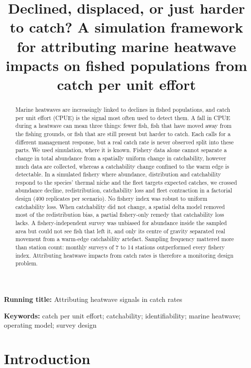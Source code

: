 \documentclass[11pt,a4paper]{article}
\title{Declined, displaced, or just harder to catch? A simulation framework for attributing marine heatwave impacts on fished populations from catch per unit effort}
\author{}
\date{}
\begin{document}
\maketitle
\linenumbers

\noindent\textbf{Running title:} Attributing heatwave signals in catch rates

\begin{abstract}
\noindent Marine heatwaves are increasingly linked to declines in fished populations, and catch per unit effort (CPUE) is the signal most often used to detect them. A fall in CPUE during a heatwave can mean three things: fewer fish, fish that have moved away from the fishing grounds, or fish that are still present but harder to catch. Each calls for a different management response, but a real catch rate is never observed split into these parts. We used simulation, where it is known. Fishery data alone cannot separate a change in total abundance from a spatially uniform change in catchability, however much data are collected, whereas a catchability change confined to the warm edge is detectable. In a simulated fishery where abundance, distribution and catchability respond to the species' thermal niche and the fleet targets expected catches, we crossed abundance decline, redistribution, catchability loss and fleet contraction in a factorial design (400 replicates per scenario). No fishery index was robust to uniform catchability loss. When catchability did not change, a spatial delta model removed most of the redistribution bias, a partial fishery-only remedy that catchability loss lacks. A fishery-independent survey was unbiased for abundance inside the sampled area but could not see fish that left it, and only its centre of gravity separated real movement from a warm-edge catchability artefact. Sampling frequency mattered more than station count: monthly surveys of 7 to 14 stations outperformed every fishery index. Attributing heatwave impacts from catch rates is therefore a monitoring design problem.
\end{abstract}

\noindent\textbf{Keywords:} catch per unit effort; catchability; identifiability; marine heatwave; operating model; survey design

\section{Introduction}
\end{document}

